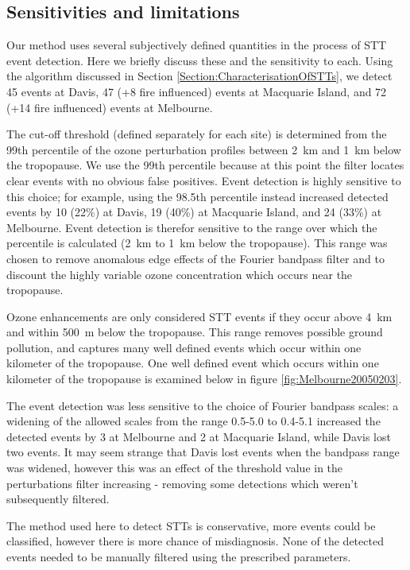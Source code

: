   \subsection{Sensitivities and limitations}
    Our method uses several subjectively defined quantities in the process of STT event detection.
    Here we briefly discuss these and the sensitivity to each.
    Using the algorithm discussed in Section \ref{Section:CharacterisationOfSTTs}, we detect 45 events at Davis, 47 (+8 fire influenced) events at Macquarie Island, and 72 (+14 fire influenced) events at Melbourne.
    
    The cut-off threshold (defined separately for each site) is determined from the 99th percentile of the ozone perturbation profiles between 2~km and 1~km below the tropopause.
    We use the 99th percentile because at this point the filter locates clear events with no obvious false positives.
    Event detection is highly sensitive to this choice; for example, using the 98.5th percentile instead increased detected events by 10 (22\%) at Davis, 19 (40\%) at Macquarie Island, and 24 (33\%) at Melbourne.
    Event detection is therefor sensitive to the range over which the percentile is calculated (2~km to 1~km below the tropopause).
    This range was chosen to remove anomalous edge effects of the Fourier bandpass filter and to discount the highly variable ozone concentration which occurs near the tropopause.
    
    Ozone enhancements are only considered STT events if they occur above 4~km and within 500~m below the tropopause.
    This range removes possible ground pollution, and captures many well defined events which occur within one kilometer of the tropopause.
    One well defined event which occurs within one kilometer of the tropopause is examined below in figure \ref{fig:Melbourne20050203}.
    
    The event detection was less sensitive to the choice of Fourier bandpass scales: a widening of the allowed scales from the range 0.5-5.0 to 0.4-5.1 increased the detected events by 3 at Melbourne and 2 at Macquarie Island, while Davis lost two events.
    It may seem strange that Davis lost events when the bandpass range was widened, however this was an effect of the threshold value in the perturbations filter increasing - removing some detections which weren't subsequently filtered.
    
    The method used here to detect STTs is conservative, more events could be classified, however there is more chance of misdiagnosis. 
    None of the detected events needed to be manually filtered using the prescribed parameters.

